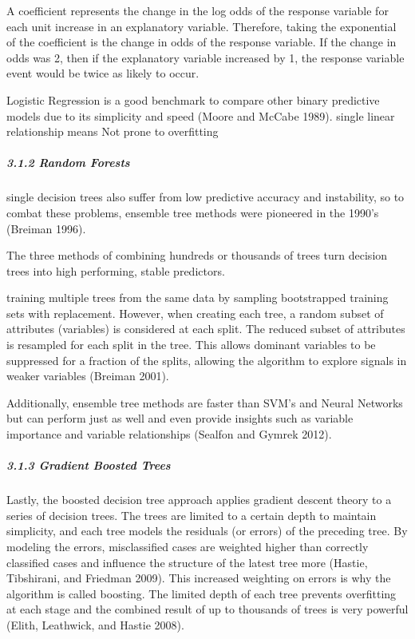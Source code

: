 \documentclass[]{elsarticle} %
\begin{document}
A coefficient represents the change in the log odds of the response
variable for each unit increase in an explanatory variable. Therefore,
taking the exponential of the coefficient is the change in odds of the
response variable. If the change in odds was 2, then if the explanatory
variable increased by 1, the response variable event would be twice as
likely to occur.

Logistic Regression is a good benchmark to compare other binary
predictive models due to its simplicity and speed (Moore and McCabe
1989). single linear relationship means Not prone to overfitting

\subparagraph{3.1.2 Random Forests}\label{random-forests}

single decision trees also suffer from low predictive accuracy and
instability, so to combat these problems, ensemble tree methods were
pioneered in the 1990's (Breiman 1996).

The three methods of combining hundreds or thousands of trees turn
decision trees into high performing, stable predictors.

training multiple trees from the same data by sampling bootstrapped
training sets with replacement. However, when creating each tree, a
random subset of attributes (variables) is considered at each split. The
reduced subset of attributes is resampled for each split in the tree.
This allows dominant variables to be suppressed for a fraction of the
splits, allowing the algorithm to explore signals in weaker variables
(Breiman 2001).

Additionally, ensemble tree methods are faster than SVM's and Neural
Networks but can perform just as well and even provide insights such as
variable importance and variable relationships (Sealfon and Gymrek
2012).

\subparagraph{3.1.3 Gradient Boosted
Trees}\label{gradient-boosted-trees}

Lastly, the boosted decision tree approach applies gradient descent
theory to a series of decision trees. The trees are limited to a certain
depth to maintain simplicity, and each tree models the residuals (or
errors) of the preceding tree. By modeling the errors, misclassified
cases are weighted higher than correctly classified cases and influence
the structure of the latest tree more (Hastie, Tibshirani, and Friedman
2009). This increased weighting on errors is why the algorithm is called
boosting. The limited depth of each tree prevents overfitting at each
stage and the combined result of up to thousands of trees is very
powerful (Elith, Leathwick, and Hastie 2008).
\end{document}
